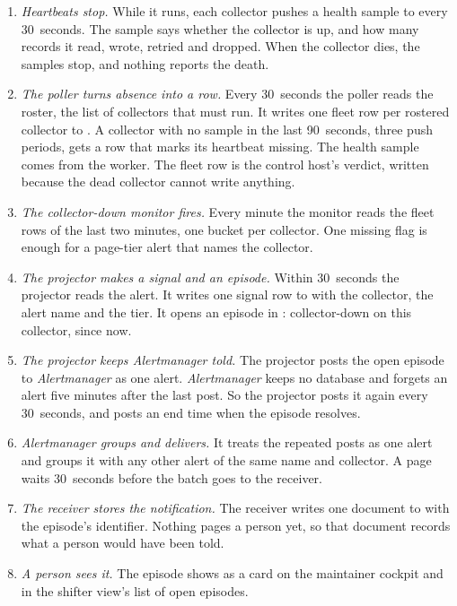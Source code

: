 \begin{enumerate}[itemsep=3pt]
\item \emph{Heartbeats stop.} While it runs, each collector pushes a health sample to  every 30~seconds. The sample says whether the collector is up, and how many records it read, wrote, retried and dropped. When the collector dies, the samples stop, and nothing reports the death.
\item \emph{The poller turns absence into a row.} Every 30~seconds the poller reads the roster, the list of collectors that must run. It writes one fleet row per rostered collector to . A collector with no sample in the last 90~seconds, three push periods, gets a row that marks its heartbeat missing. The health sample comes from the worker. The fleet row is the control host's verdict, written because the dead collector cannot write anything.
\item \emph{The collector-down monitor fires.} Every minute the monitor reads the fleet rows of the last two minutes, one bucket per collector. One missing flag is enough for a page-tier alert that names the collector.
\item \emph{The projector makes a signal and an episode.} Within 30~seconds the projector reads the alert. It writes one signal row to  with the collector, the alert name and the tier. It opens an episode in : collector-down on this collector, since now.
\item \emph{The projector keeps \textit{Alertmanager} told.} The projector posts the open episode to \textit{Alertmanager} as one alert. \textit{Alertmanager} keeps no database and forgets an alert five minutes after the last post. So the projector posts it again every 30~seconds, and posts an end time when the episode resolves.
\item \emph{\textit{Alertmanager} groups and delivers.} It treats the repeated posts as one alert and groups it with any other alert of the same name and collector. A page waits 30~seconds before the batch goes to the receiver.
\item \emph{The receiver stores the notification.} The receiver writes one document to  with the episode's identifier. Nothing pages a person yet, so that document records what a person would have been told.
\item \emph{A person sees it.} The episode shows as a card on the maintainer cockpit and in the shifter view's list of open episodes.
\end{enumerate}

